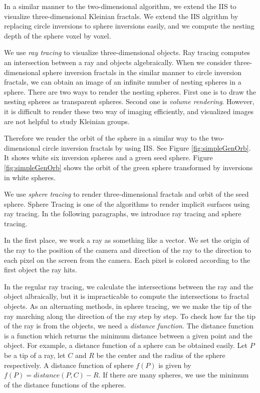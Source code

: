 In a similar manner to the two-dimensional algorithm,
we extend the IIS to visualize three-dimensional Kleinian fractals.
We extend the IIS algrithm by replacing circle inversions to sphere inversions easily, 
and we compute the nesting depth of the sphere voxel by voxel.

We use \textit{ray tracing} to visualize three-dimensional objects.
Ray tracing computes an intersection between a ray and objects
algebraically.
When we consider three-dimensional sphere inversion fractals in the similar
manner to circle inversion fractals, we can obtain an image of an
infinite number of nesting spheres in a sphere.
There are two ways to render the nesting spheres. First one is to draw
the nesting spheres as transparent spheres.
Second one is \textit{volume rendering}.
However, it is difficult to render these two way of imaging efficiently, and
visualized images are not helpful to study Kleinian groups.

Therefore we render the orbit of the sphere in a similar way to the
two-dimensional circle inversion fractals by using IIS.
See Figure \ref{fig:simpleGenOrb}. It shows
white six inversion spheres and a green seed sphere.
Figure \ref{fig:simpleGenOrb} shows the orbit of
the green sphere transformed by inversions in white spheres.

We use \textit{sphere tracing} \cite{hart1996sphere} to render three-dimensional
fractals and orbit of the seed sphere.
Sphere Tracing is one of the algorithms to render implicit surfaces using
ray tracing.
In the following paragraphs, we introduce ray tracing and
sphere tracing.

In the first place, we work a ray as something like a vector.
We set the origin of the ray to the position of the camera
and direction of the ray to the direction to each pixel on the screen
from the camera. Each pixel is colored according to the
first object the ray hits. 

In the regular ray tracing, we calculate the intersections between the
ray and the object albraically, but
it is impracticable to compute the intersections to fractal objects.
As an alternating methods, in sphere tracing, we we make the tip of the
ray marching along the direction of the ray step by step. 
To check how far the tip of the ray is from the objects, we need a
\textit{distance function}.
The distance function is a function which returns the minimum distance
between a given point and the object.
For example, a distance function of a sphere can be obtained easily.
Let $P$ be a tip of a ray, let $C$ and $R$ be the center and the radius
of the sphere respectively.
A distance function of sphere $f(P)$ is given by $f(P) = distance(P, C) - R$.
If there are many spheres, we use the minimum of the distance functions
of the spheres.

